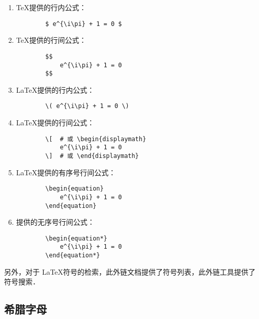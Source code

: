 \begin{enumerate}
    \item \TeX 提供的行内公式：
    \begin{verbatim}
        $ e^{\i\pi} + 1 = 0 $
    \end{verbatim}
    
    \item \TeX 提供的行间公式：
    \begin{verbatim}
        $$
            e^{\i\pi} + 1 = 0
        $$
    \end{verbatim}
    
    \item \LaTeX 提供的行内公式：
    \begin{verbatim}
        \( e^{\i\pi} + 1 = 0 \)
    \end{verbatim}
    
    \item \LaTeX 提供的行间公式：
    \begin{verbatim}
        \[  # 或 \begin{displaymath}
            e^{\i\pi} + 1 = 0
        \]  # 或 \end{displaymath}
    \end{verbatim}
    
    \item \LaTeX 提供的有序号行间公式：
    \begin{verbatim}
        \begin{equation}
            e^{\i\pi} + 1 = 0
        \end{equation}
    \end{verbatim}
    
    \item \AmS 提供的无序号行间公式：
    \begin{verbatim}
        \begin{equation*}
            e^{\i\pi} + 1 = 0
        \end{equation*}
    \end{verbatim}
\end{enumerate}

另外，对于 \LaTeX 符号的检索，此外链文档\cite{symbols}提供了符号列表，此外链工具\cite{Detexify}提供了符号搜索．

\newpage
\subsection{希腊字母}

